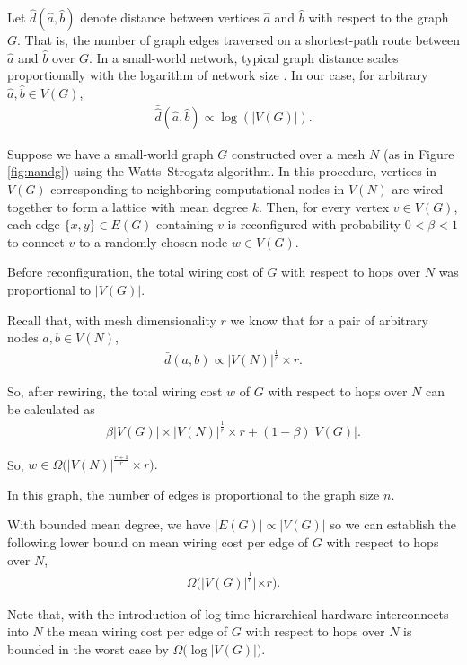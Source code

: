 Let $\hat{d}(\hat{a},\hat{b})$ denote distance between vertices $\hat{a}$ and $\hat{b}$ with respect to the graph $G$.
That is, the number of graph edges traversed on a shortest-path route between $\hat{a}$ and $\hat{b}$ over $G$.
In a small-world network, typical graph distance scales proportionally with the logarithm of network size \citep{watts1998collective}.
In our case, for arbitrary $\hat{a},\hat{b} \in V(G)$,
\begin{align} \label{eqn:smallworld_prop}
\bar{\hat{d}}(\hat{a},\hat{b}) \propto \log(|V(G)|).
\end{align}

Suppose we have a small-world graph $G$ constructed over a mesh $N$ (as in Figure \ref{fig:nandg}) using the Watts–Strogatz algorithm.
In this procedure, vertices in $V(G)$ corresponding to neighboring computational nodes in $V(N)$ are wired together to form a lattice with mean degree $k$.
Then, for every vertex $v \in V(G)$, each edge $\{x, y\} \in E(G)$ containing $v$ is reconfigured with probability $0 < \beta < 1$ to connect $v$ to a randomly-chosen node $w \in V(G)$.

Before reconfiguration, the total wiring cost of $G$ with respect to hops over $N$ was proportional to $|V(G)|$.

Recall that, with mesh dimensionality $r$ we know that for a pair of arbitrary nodes $a,b \in V(N)$,
\begin{align*}
\bar{d}(a, b) \propto |V(N)|^{\frac{1}{r}} \times r.
\end{align*}

So, after rewiring, the total wiring cost $w$ of $G$ with respect to hops over $N$ can be calculated as
\begin{align*}
  \beta |V(G)| \times |V(N)|^{\frac{1}{r}} \times r + (1 - \beta) |V(G)|.
\end{align*}

So, $w \in \Omega \Big( |V(N)|^{\frac{r+1}{r}} \times r \Big).$

In this graph, the number of edges is proportional to the graph size $n$.

With bounded mean degree, we have $|E(G)| \propto |V(G)|$ so we can establish the following lower bound on mean wiring cost per edge of $G$ with respect to hops over $N$,
\begin{align*}
\Omega \Big( |V(G)|^{\frac{1}{r}}| \times r \Big).
\end{align*}

Note that, with the introduction of log-time hierarchical hardware interconnects into $N$ the mean wiring cost per edge of $G$ with respect to hops over $N$ is bounded in the worst case by $\Omega \Big( \log |V(G)| \Big)$.
